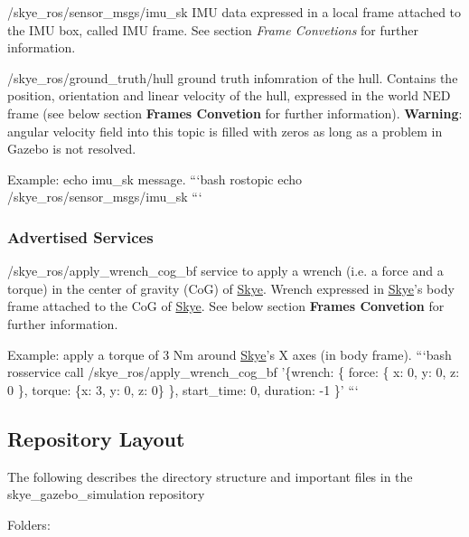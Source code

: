 {\ttfamily 
\begin{DoxyItemize}
\item /skye\-\_\-ros/sensor\-\_\-msgs/imu\-\_\-sk I\-M\-U data expressed in a local frame attached to the I\-M\-U box, called I\-M\-U frame. See section {\itshape Frame Convetions} for further information.
\item /skye\-\_\-ros/ground\-\_\-truth/hull ground truth infomration of the hull. Contains the position, orientation and linear velocity of the hull, expressed in the world N\-E\-D frame (see below section {\bfseries Frames Convetion} for further information). {\bfseries Warning}\-: angular velocity field into this topic is filled with zeros as long as a problem in Gazebo is not resolved.
\end{DoxyItemize}}

{\ttfamily Example\-: echo imu\-\_\-sk message. ```bash rostopic echo /skye\-\_\-ros/sensor\-\_\-msgs/imu\-\_\-sk ```}

{\ttfamily \subsubsection*{Advertised Services}}

{\ttfamily 
\begin{DoxyItemize}
\item /skye\-\_\-ros/apply\-\_\-wrench\-\_\-cog\-\_\-bf service to apply a wrench (i.\-e. a force and a torque) in the center of gravity (Co\-G) of \hyperlink{class_skye}{Skye}. Wrench expressed in \hyperlink{class_skye}{Skye}'s body frame attached to the Co\-G of \hyperlink{class_skye}{Skye}. See below section {\bfseries Frames Convetion} for further information.
\end{DoxyItemize}}

{\ttfamily Example\-: apply a torque of 3 Nm around \hyperlink{class_skye}{Skye}'s X axes (in body frame). ```bash rosservice call /skye\-\_\-ros/apply\-\_\-wrench\-\_\-cog\-\_\-bf '\{wrench\-: \{ force\-: \{ x\-: 0, y\-: 0, z\-: 0 \}, torque\-: \{x\-: 3, y\-: 0, z\-: 0\} \}, start\-\_\-time\-: 0, duration\-: -\/1 \}' ``` \subsection*{Repository Layout}}

{\ttfamily  The following describes the directory structure and important files in the skye\-\_\-gazebo\-\_\-simulation repository}

{\ttfamily Folders\-:}

